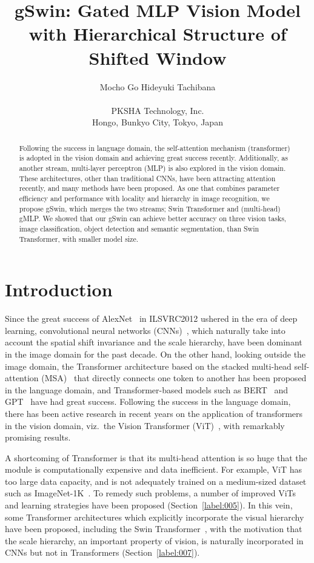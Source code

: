 \documentclass{article}
\title{gSwin: Gated MLP Vision Model with Hierarchical Structure of Shifted Window}
\author{Mocho Go \qquad Hideyuki Tachibana\\
    \\
    PKSHA Technology, Inc.\\
    Hongo, Bunkyo City, Tokyo, Japan\\
}
\begin{document}
\maketitle

\begin{abstract}
    Following the success in language domain, the self-attention mechanism (transformer) is adopted in the vision domain and achieving great success recently.
    Additionally, as another stream, multi-layer perceptron (MLP) is also explored in the vision domain. These architectures, other than traditional CNNs, have been attracting attention recently, and many methods have been proposed. As one that combines parameter efficiency and performance with locality and hierarchy in image recognition, we propose gSwin, which merges the two streams; Swin Transformer and (multi-head) gMLP. We showed that our gSwin can achieve better accuracy on three vision tasks, image classification, object detection and semantic segmentation, than Swin Transformer, with smaller model size.
\end{abstract}

\section{Introduction}
Since the great success of AlexNet~\citep{krizhevsky2012imagenet} in ILSVRC2012 ushered in the era of deep learning, convolutional neural networks (CNNs)~\citep{fukushima1980neocognitron,lecun1989backpropagation,zeiler2014visualizing,szegedy2015going,simonyan2014very,he2016deep,tan2019efficientnet}, which naturally take into account the spatial shift invariance and the scale hierarchy, have been dominant in the image domain for the past decade. On the other hand, looking outside the image domain, the Transformer architecture based on the stacked multi-head self-attention (MSA)~\citep{vaswani2017attention} that directly connects one token to another has been proposed in the language domain, and Transformer-based models such as BERT~\citep{devlin2018bert} and GPT~\citep{radford2018improving} have had great success.
Following the success in the language domain, there has been active research in recent years on the application of transformers in the vision domain, viz.\ the Vision Transformer (ViT)~\citep{dosovitskiy2020image}, with remarkably promising results.

A shortcoming of Transformer is that its multi-head attention is so huge that the module is computationally expensive and data inefficient.
For example, ViT has too large data capacity, and is not adequately trained on a medium-sized dataset such as ImageNet-1K~\citep{deng2009imagenet}.
To remedy such problems, a number of improved ViTs and learning strategies have been proposed (Section~\ref{label:005}).
In this vein, some Transformer architectures which explicitly incorporate the visual hierarchy have been proposed, including the Swin Transformer~\citep{liu2021swin}, with the motivation that the scale hierarchy, an important property of vision, is naturally incorporated in CNNs but not in Transformers (Section~\ref{label:007}).
\end{document}
